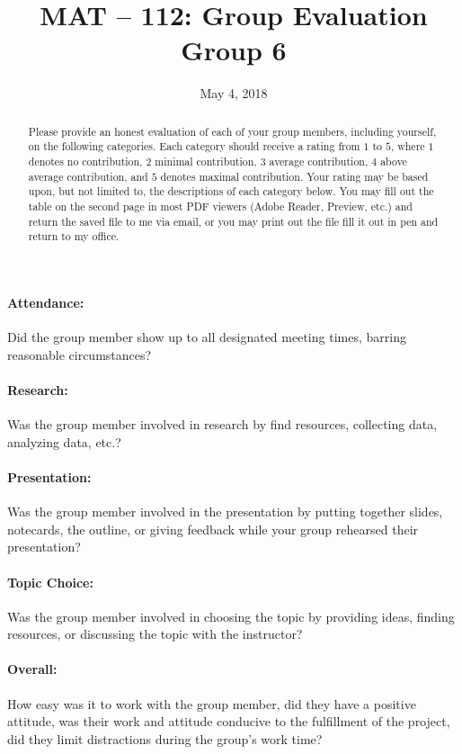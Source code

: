 \documentclass{article}
\title{MAT -- 112: Group Evaluation\\
\large{Group 6}}
\date{May 4, 2018}
\begin{document}
\maketitle

\begin{abstract}
Please provide an honest evaluation of each of your group members, including yourself, on the following categories. Each category should receive a rating from $1$ to $5$, where $1$ denotes no contribution, $2$ minimal contribution, $3$ average contribution, $4$ above average contribution, and $5$ denotes maximal contribution.  Your rating may be based upon, but not limited to, the descriptions of each category below. You may fill out the table on the second page in most PDF viewers (Adobe Reader, Preview, etc.) and return the saved file to me via email, or you may print out the file fill it out in pen and return to my office. 
\end{abstract}

\paragraph*{Attendance:} Did the group member show up to all designated meeting times, barring reasonable circumstances?
\paragraph*{Research:} Was the group member involved in research by find resources, collecting data, analyzing data, etc.?
\paragraph*{Presentation:} Was the group member involved in the presentation by putting together slides, notecards, the outline, or giving feedback while your group rehearsed their presentation?
\paragraph*{Topic Choice:} Was the group member involved in choosing the topic by providing ideas, finding resources, or discussing the topic with the instructor?
\paragraph*{Overall:} How easy was it to work with the group member, did they have a positive attitude, was their work and attitude conducive to the fulfillment of the project, did they limit distractions during the group's work time?
\end{document}
